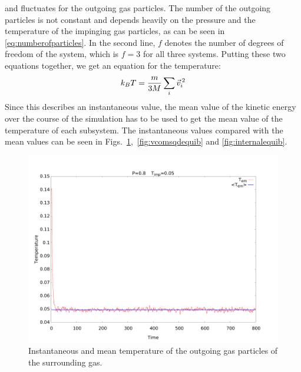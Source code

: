 \documentclass[12pt]{article}
\begin{document}
and fluctuates for the outgoing gas particles. The number of the outgoing particles is not constant and depends heavily on the pressure and the
temperature of the impinging gas particles, as can be seen in \eqref{eq:numberofparticles}. In the second line, $f$ denotes the number of degrees of
freedom of the system, which is $f=3$ for all three systems. Putting these two equations together, we get an equation for the temperature:
\begin{equation}
    k_B T = \frac{m}{3 M} \sum_i \vec{v}_i^{\, 2} \\
\end{equation}
Since this describes an instantaneous value, the mean value of the kinetic energy over the course of the simulation has to be used to get the mean value
of the temperature of each subsystem. The instantaneous values compared with the mean values can be seen in
Figs.~\ref{fig:outgoingequib},~\ref{fig:vcomsqdequib} and \ref{fig:internalequib}.
\begin{figure}[h]
    \begin{center}
        \includegraphics[scale=0.4]{images/gastemp.pdf}
        \caption{Instantaneous and mean temperature of the outgoing gas particles of the surrounding gas.}
        \label{fig:outgoingequib}
    \end{center}
\end{figure}
\end{document}
